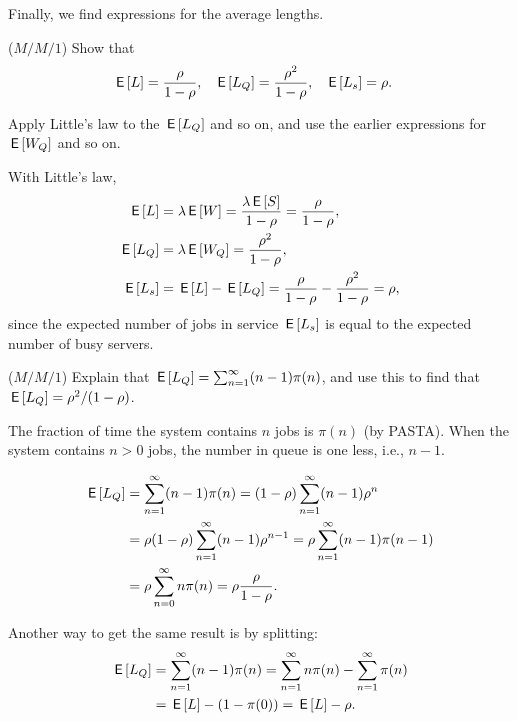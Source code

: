 Finally, we find expressions for  the average lengths.
\begin{exercise}($M/M/1$)
  Show that
  \begin{align*}
\,\mathsf{E}\left[L\right] &= \frac\rho{1-\rho}, & \,\mathsf{E}\left[L_Q\right] &= \frac{\rho^2}{1-\rho}, & \,\mathsf{E}\left[L_s\right] &= \rho.
  \end{align*}
  \begin{hint}
    Apply Little's law to the $\,\mathsf{E}\left[L_Q\right]$ and so on, and use the earlier expressions for $\,\mathsf{E}\left[W_Q\right]$ and so on.
  \end{hint}
  \begin{solution}
With Little's law, 
\begin{equation*}
  \begin{split}
\,\mathsf{E}\left[L\right] &= \lambda \,\mathsf{E}\left[W\right] = \frac{\lambda \,\mathsf{E}\left[S\right]}{1-\rho} = \frac\rho{1-\rho}, \\
  \,\mathsf{E}\left[L_Q\right] &= \lambda \,\mathsf{E}\left[W_Q\right] = \frac{\rho^2}{1-\rho}, \\
  \,\mathsf{E}\left[L_s\right] &= \,\mathsf{E}\left[L\right] - \,\mathsf{E}\left[L_Q\right] = \frac{\rho}{1-\rho} - \frac{\rho^2}{1-\rho} = \rho, 
      \end{split}
\end{equation*}
since the expected number of jobs in service $\,\mathsf{E}\left[L_s\right]$ is
equal to the expected number of busy servers.
  \end{solution}
\end{exercise}

\begin{exercise}($M/M/1$) Explain that
$\,\mathsf{E}\left[L_Q\right] = \sum_{n=1}^\infty (n-1)\pi(n)$, and  use this to find that $\,\mathsf{E}\left[L_Q\right]=\rho^2/(1-\rho)$.
  \begin{solution}
    The fraction of time the system contains $n$ jobs is $\pi(n)$ (by
    PASTA). When the system contains $n>0$ jobs, the number in queue
    is one less, i.e., $n-1$.

    \begin{equation*}
      \begin{split}
\,\mathsf{E}\left[L_Q\right] 
&= \sum_{n=1}^\infty (n-1)\pi(n) 
= (1-\rho)\sum_{n=1}^\infty (n-1) \rho^n\\
&= \rho (1-\rho)\sum_{n=1}^\infty (n-1) \rho^{n-1}
= \rho \sum_{n=1}^\infty (n-1) \pi(n-1)\\
&= \rho \sum_{n=0}^\infty n \pi(n)
= \rho \frac{\rho}{1-\rho}.
      \end{split}
    \end{equation*}

Another way to get the same result is by splitting: 
\begin{equation*}
  \begin{split}
\,\mathsf{E}\left[L_Q\right] 
&= \sum_{n=1}^\infty (n-1)\pi(n) 
=\sum_{n=1}^\infty n\pi(n) -\sum_{n=1}^\infty \pi(n)\\
&= \,\mathsf{E}\left[L\right] - (1-\pi(0)) = \,\mathsf{E}\left[L\right] - \rho.
  \end{split}
\end{equation*}
  \end{solution}
\end{exercise}

